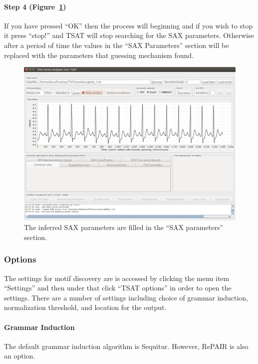 \documentclass[titlepage, letterpaper, 12pt]{article}
\begin{document}
\paragraph{Step 4 (Figure~\ref{fig:step3-guessresults})} If you  have pressed ``OK'' then the process will beginning and if you wish to stop it press ``stop!'' and TSAT will stop searching for the SAX parameters.  Otherwise after a period of time the values in the ``SAX Parameters'' section will be replaced with the parameters that guessing mechanism found.

\begin{figure}[H]
	\centering
	\includegraphics[width=\textwidth]{pictures/motifguide/step3-guessresults}
	\caption{The inferred SAX parameters are filled in the ``SAX parameters'' section.}
	\label{fig:step3-guessresults}
\end{figure}

\subsubsection{Options}

The settings for motif discovery are is accessed by clicking the menu item ``Settings'' and then under that click ``TSAT options'' in order to open the settings.  There are a number of settings including choice of grammar induction, normalization threshold, and location for the output.

\paragraph{Grammar Induction}
The default grammar induction algorithm is Sequitur.  However, RePAIR is also an option. 
\end{document}
